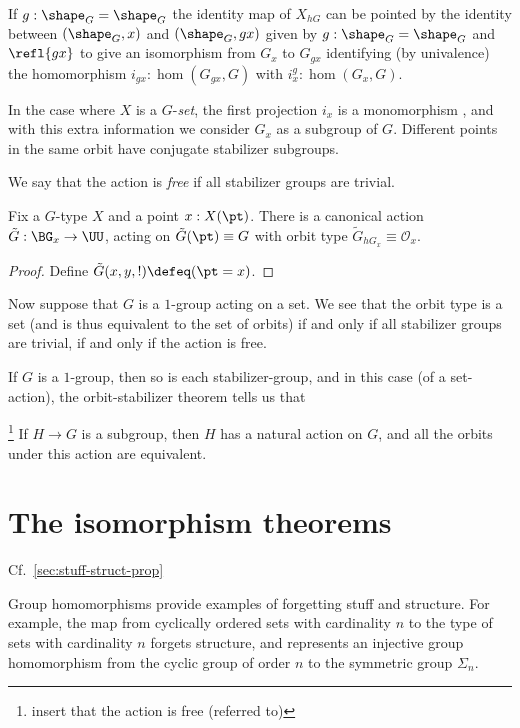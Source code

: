  If $g:\shape_G=\shape_G$ the identity map of $X_{hG}$ can be pointed by the identity between $(\shape_G,x) $ and $(\shape_G,gx)$ given by $g:\shape_G=\shape_G$ and $\refl{gx}$ to give an isomorphism from $G_x$ to $G_{gx}$ identifying (by univalence) the homomorphism $i_{gx}:\hom(G_{gx},G)$ with $i^g_x:\hom(G_x,G)$.


In the case where $X$ is a $G$-\emph{set}, the first projection $i_x$ is a monomorphism , and with this extra information we consider $G_x$ as a subgroup of $G$.
Different points in the same orbit have conjugate stabilizer subgroups.


We say that the action is \emph{free} if all stabilizer groups are trivial.

\begin{theorem}
  \label{thm:orbitstab}
  Fix a $G$-type $X$ and a point $x : X(\pt)$.
  There is a canonical action $\tilde G : \BG_x \to \UU$,
  acting on $\tilde G(\pt)\equiv G$
  with orbit type $\tilde G_{hG_x} \equiv \mathcal O_x$.
\end{theorem}
\begin{proof}
  Define $\tilde G(x,y,!) \defeq (\pt = x)$.
\end{proof}

Now suppose that $G$ is a $1$-group acting on a set.
We see that the orbit type is a set
(and is thus equivalent to the set of orbits)
if and only if
all stabilizer groups are trivial,
\ie if and only if the action is free.

If $G$ is a $1$-group,
then so is each stabilizer-group,
and in this case (of a set-action),
the orbit-stabilizer theorem
tells us that

\begin{theorem}\footnote{insert that the action is free (referred to)}
\label{thm:lagrange}
  If $H \to G$ is a subgroup, then $H$ has a natural action on $G$,
  and all the orbits under this action are equivalent.
\end{theorem}


\section{The isomorphism theorems}
\label{sec:noether-theorems}

Cf.~\cref{sec:stuff-struct-prop}

Group homomorphisms provide examples of forgetting stuff and structure.
For example, the map from cyclically ordered sets with cardinality $n$
to the type of sets with cardinality $n$ forgets structure,
and represents an injective group homomorphism from the cyclic
group of order $n$ to the symmetric group $\Sigma_n$.

